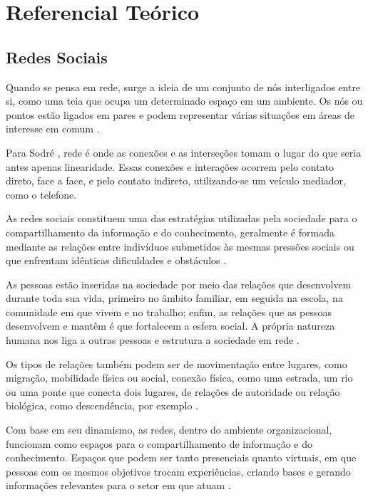 \chapter{Referencial Teórico}


\section{Redes Sociais}

Quando se pensa em rede, surge a ideia de um conjunto de nós interligados entre si, como uma teia que ocupa um determinado espaço em um ambiente. Os nós ou pontos estão ligados em pares e podem representar várias situações em áreas de interesse em comum \cite{Newman:2010}.

Para Sodré \cite{Sodre:2002}, rede é onde as conexões e as interseções tomam o lugar do que seria antes apenas linearidade. Essas conexões e interações ocorrem pelo contato direto, face a face, e pelo contato indireto, utilizando-se um veículo mediador, como o telefone.

As redes sociais constituem uma das estratégias utilizadas pela sociedade para o compartilhamento da informação e do conhecimento, geralmente é formada mediante as relações entre indivíduos submetidos às mesmas pressões sociais ou que enfrentam idênticas dificuldades e obstáculos \cite{Tomae:Alcara:Chiara:2005}.

As pessoas estão inseridas na sociedade por meio das relações que desenvolvem durante toda sua vida, primeiro no âmbito familiar, em seguida na escola, na comunidade em que vivem e no trabalho; enfim, as relações que as pessoas desenvolvem e mantêm é que fortalecem a esfera social. A própria natureza humana nos liga a outras pessoas e estrutura a sociedade em rede \cite{Tomae:Alcara:Chiara:2005}.

Os tipos de relações também podem ser de movimentação entre lugares, como migração, mobilidade física ou social, conexão física, como uma estrada, um rio ou uma ponte que conecta dois lugares, de relações de autoridade ou relação biológica, como descendência, por exemplo \cite{Wasserman:1994}.

Com base em seu dinamismo, as redes, dentro do ambiente organizacional, funcionam como espaços para o compartilhamento de informação e do conhecimento. Espaços que podem ser tanto presenciais quanto virtuais, em que pessoas com os mesmos objetivos trocam experiências, criando bases e gerando informações relevantes para o setor em que atuam \cite{Tomae:Alcara:Chiara:2005}.

